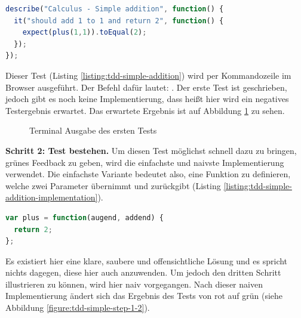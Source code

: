 \begin{lstlisting}[language=JavaScript, caption=TDD - Calculus - Simple addition, label=listing:tdd-simple-addition]
describe("Calculus - Simple addition", function() {
  it("should add 1 to 1 and return 2", function() {
    expect(plus(1,1)).toEqual(2);
  });
});
\end{lstlisting}

Dieser Test (Listing \ref{listing:tdd-simple-addition}) wird per Kommandozeile im Browser  ausgeführt. Der Befehl dafür lautet: . Der erste Test ist geschrieben, jedoch gibt es noch keine Implementierung, dass heißt hier wird ein negatives Testergebnis erwartet. Das erwartete Ergebnis ist auf Abbildung \ref{figure:tdd-simple-step-1-1} zu sehen.

\begin{figure}[H]
  \centering
  \caption{Terminal Ausgabe des ersten Tests}
  \label{figure:tdd-simple-step-1-1}
\end{figure}

\textbf{Schritt 2: Test bestehen.}\newline
Um diesen Test möglichst schnell dazu zu bringen, grünes Feedback zu geben, wird die einfachste und naivste Implementierung verwendet. Die einfachste Variante bedeutet also, eine Funktion zu definieren, welche zwei Parameter übernimmt und \glqq{2\grqq} zurückgibt (Listing \ref{listing:tdd-simple-addition-implementation}).

\begin{lstlisting}[language=JavaScript, caption=TDD - Calculus - Simple addition - Implementation, label=listing:tdd-simple-addition-implementation]
var plus = function(augend, addend) {
  return 2;
};
\end{lstlisting}

Es existiert hier eine klare, saubere und offensichtliche Lösung und es spricht nichts dagegen, diese hier auch anzuwenden. Um jedoch den dritten Schritt illustrieren zu können, wird hier naiv vorgegangen.\newline
Nach dieser naiven Implementierung ändert sich das Ergebnis des Tests von rot auf grün (siehe Abbildung \ref{figure:tdd-simple-step-1-2}).

